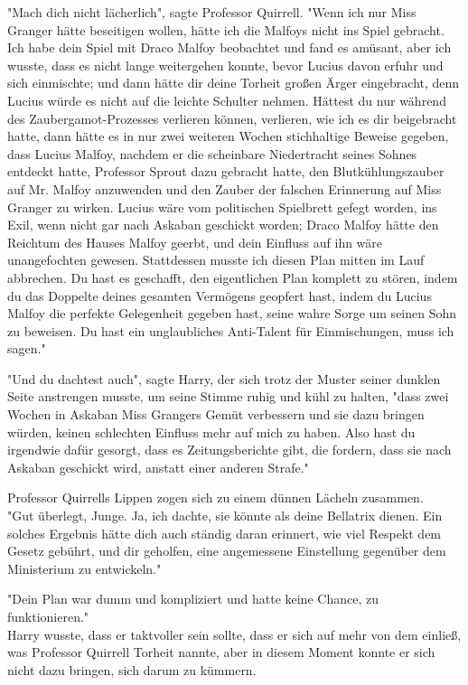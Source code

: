 {"Mach dich nicht lächerlich", sagte Professor Quirrell. "Wenn ich nur Miss Granger hätte beseitigen wollen, hätte ich die Malfoys nicht ins Spiel gebracht. Ich habe dein Spiel mit Draco Malfoy beobachtet und fand es amüsant, aber ich wusste, dass es nicht lange weitergehen konnte, bevor Lucius davon erfuhr und sich einmischte; und dann hätte dir deine Torheit großen Ärger eingebracht, denn Lucius würde es nicht auf die leichte Schulter nehmen. Hättest du nur während des Zaubergamot-Prozesses verlieren können, verlieren, wie ich es dir beigebracht hatte, dann hätte es in nur zwei weiteren Wochen stichhaltige Beweise gegeben, dass Lucius Malfoy, nachdem er die scheinbare Niedertracht seines Sohnes entdeckt hatte, Professor Sprout dazu gebracht hatte, den Blutkühlungszauber auf Mr. Malfoy anzuwenden und den Zauber der falschen Erinnerung auf Miss Granger zu wirken. Lucius wäre vom politischen Spielbrett gefegt worden, ins Exil, wenn nicht gar nach Askaban geschickt worden; Draco Malfoy hätte den Reichtum des Hauses Malfoy geerbt, und dein Einfluss auf ihn wäre unangefochten gewesen. Stattdessen musste ich diesen Plan mitten im Lauf abbrechen. Du hast es geschafft, den eigentlichen Plan komplett zu stören, indem du das Doppelte deines gesamten Vermögens geopfert hast, indem du Lucius Malfoy die perfekte Gelegenheit gegeben hast, seine wahre Sorge um seinen Sohn zu beweisen. Du hast ein unglaubliches Anti-Talent für Einmischungen, muss ich sagen."

"Und du dachtest auch", sagte Harry, der sich trotz der Muster seiner dunklen Seite anstrengen musste, um seine Stimme ruhig und kühl zu halten, "dass zwei Wochen in Askaban Miss Grangers Gemüt verbessern und sie dazu bringen würden, keinen schlechten Einfluss mehr auf mich zu haben. Also hast du irgendwie dafür gesorgt, dass es Zeitungsberichte gibt, die fordern, dass sie nach Askaban geschickt wird, anstatt einer anderen Strafe."

Professor Quirrells Lippen zogen sich zu einem dünnen Lächeln zusammen.\\ "Gut überlegt, Junge. Ja, ich dachte, sie könnte als deine Bellatrix dienen. Ein solches Ergebnis hätte dich auch ständig daran erinnert, wie viel Respekt dem Gesetz gebührt, und dir geholfen, eine angemessene Einstellung gegenüber dem Ministerium zu entwickeln."

"Dein Plan war dumm und kompliziert und hatte keine Chance, zu funktionieren."\\ Harry wusste, dass er taktvoller sein sollte, dass er sich auf mehr von dem einließ, was Professor Quirrell Torheit nannte, aber in diesem Moment konnte er sich nicht dazu bringen, sich darum zu kümmern.

}
